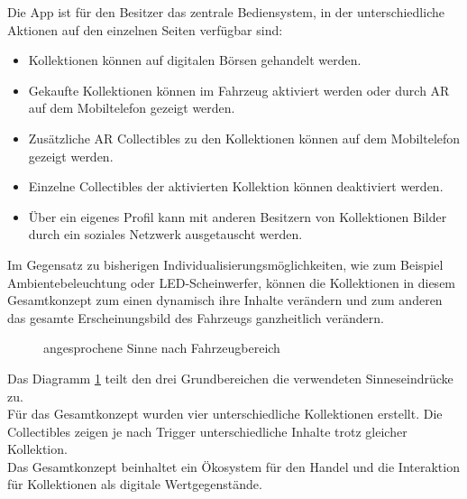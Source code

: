 Die App ist für den Besitzer das zentrale Bediensystem, in der unterschiedliche Aktionen auf den einzelnen Seiten verfügbar sind:
\begin{itemize}
	\item Kollektionen können auf digitalen Börsen gehandelt werden.
	\item Gekaufte Kollektionen können im Fahrzeug aktiviert werden oder durch AR auf dem Mobiltelefon gezeigt werden.
	\item Zusätzliche AR Collectibles zu den Kollektionen können auf dem Mobiltelefon gezeigt werden.
	\item Einzelne Collectibles der aktivierten Kollektion können deaktiviert werden.
	\item Über ein eigenes Profil kann mit anderen Besitzern von Kollektionen Bilder durch ein soziales Netzwerk ausgetauscht werden.
\end{itemize}
Im Gegensatz zu bisherigen Individualisierungsmöglichkeiten, wie zum Beispiel Ambientebeleuchtung oder LED-Scheinwerfer, können die Kollektionen in diesem Gesamtkonzept zum einen dynamisch ihre Inhalte verändern und zum anderen das gesamte Erscheinungsbild des Fahrzeugs ganzheitlich verändern. \\
\begin{figure}[hbt]
	\centering
	
	\caption[angesprochene Sinne nach Fahrzeugbereich]{angesprochene Sinne nach Fahrzeugbereich}
	\label{fig:sinneeinteilung}
\end{figure}

Das Diagramm \ref{fig:sinneeinteilung} teilt den drei Grundbereichen die verwendeten Sinneseindrücke zu. \\
Für das Gesamtkonzept wurden vier unterschiedliche Kollektionen erstellt. Die Collectibles zeigen je nach Trigger unterschiedliche Inhalte trotz gleicher Kollektion. \\
Das Gesamtkonzept beinhaltet ein Ökosystem für den Handel und die Interaktion für Kollektionen als digitale Wertgegenstände.

